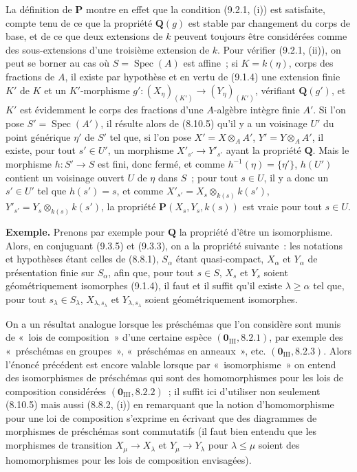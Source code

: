 La définition de $\mathbf P$ montre en effet que la condition (9.2.1, (i))
est satisfaite, compte tenu de ce que la propriété $\mathbf Q(g)$ est stable
par changement du corps de base, et de ce que deux extensions de $k$ peuvent
toujours être considérées comme des sous-extensions d'une troisième extension
de $k$. Pour vérifier (9.2.1, (ii)), on peut se borner au cas où
$S=\operatorname{Spec}(A)$ est affine~; si $K=k(\eta)$, corps des fractions de
$A$, il existe par hypothèse et en vertu de (9.1.4) une extension finie $K'$ de
$K$ et un $K'$-morphisme
$g':(X_\eta)_{(K')}\to(Y_\eta)_{(K')}$, vérifiant $\mathbf Q(g')$, et $K'$ est
évidemment le corps des fractions d'une $A$-algèbre intègre finie $A'$. Si
l'on pose $S'=\operatorname{Spec}(A')$, il résulte alors de (8.10.5) qu'il y
a un voisinage $U'$ du point générique $\eta'$ de $S'$ tel que, si l'on pose
$X'=X\otimes_A A'$, $Y'=Y\otimes_A A'$, il existe, pour tout $s'\in U'$, un
morphisme $X'_{s'}\to Y'_{s'}$ ayant la propriété $\mathbf Q$. Mais le
morphisme $h:S'\to S$ est fini, donc fermé, et comme
$h^{-1}(\eta)=\{\eta'\}$, $h(U')$ contient un voisinage ouvert $U$ de $\eta$
dans $S$~; pour tout $s\in U$, il y a donc un $s'\in U'$ tel que $h(s')=s$,
et comme
$X'_{s'}=X_s\otimes_{k(s)}k(s')$,
$Y'_{s'}=Y_s\otimes_{k(s)}k(s')$, la propriété
$\mathbf P(X_s,Y_s,k(s))$ est vraie pour tout $s\in U$.

\begin{env}[9.3.6]
\label{IV.9.3.6-fr}
\textbf{Exemple.} Prenons par exemple pour $\mathbf Q$ la propriété d'être un
isomorphisme. Alors, en conjuguant (9.3.5) et (9.3.3), on a la propriété
suivante~: les notations et hypothèses étant celles de (8.8.1), $S_\alpha$
étant quasi-compact, $X_\alpha$ et $Y_\alpha$ de présentation finie sur
$S_\alpha$, afin que, pour tout $s\in S$, $X_s$ et $Y_s$ soient
géométriquement isomorphes (9.1.4), il faut et il suffit qu'il existe
$\lambda\geqslant\alpha$ tel que, pour tout $s_\lambda\in S_\lambda$,
$X_{\lambda,s_\lambda}$ et $Y_{\lambda,s_\lambda}$ soient géométriquement
isomorphes.
\end{env}

On a un résultat analogue lorsque les préschémas que l'on considère sont munis
de «~lois de composition~» d'une certaine espèce
$(\mathbf 0_{\mathrm{III}},8.2.1)$, par exemple des «~préschémas en groupes~»,
«~préschémas en anneaux~», etc. $(\mathbf 0_{\mathrm{III}},8.2.3)$. Alors
l'énoncé précédent est encore valable lorsque par «~isomorphisme~» on entend
des isomorphismes de préschémas qui sont des homomorphismes pour les lois de
composition considérées $(\mathbf 0_{\mathrm{III}},8.2.2)$~; il suffit ici
d'utiliser non seulement (8.10.5) mais aussi (8.8.2, (i)) en remarquant que la
notion d'homomorphisme pour une loi de composition s'exprime en écrivant que
des diagrammes de morphismes de préschémas sont commutatifs (il faut bien
entendu que les morphismes de transition $X_\mu\to X_\lambda$ et
$Y_\mu\to Y_\lambda$ pour $\lambda\leqslant\mu$ soient des homomorphismes
pour les lois de composition envisagées).

